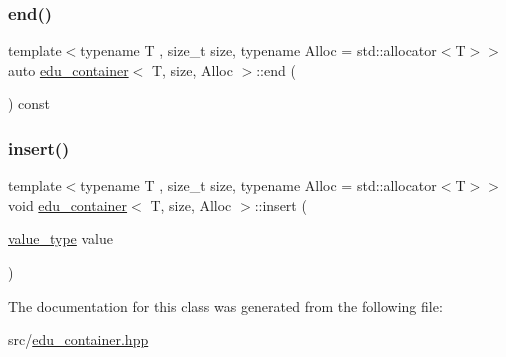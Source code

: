 \mbox{\label{classedu__container_aa32c0fa70c685557a5d35fe48a8fa1c2}} 
\subsubsection{\texorpdfstring{end()}{end()}}
{\footnotesize\ttfamily template$<$typename T , size\+\_\+t size, typename Alloc  = std\+::allocator$<$\+T$>$$>$ \\
auto \hyperlink{classedu__container}{edu\+\_\+container}$<$ T, size, Alloc $>$\+::end (\begin{DoxyParamCaption}{ }\end{DoxyParamCaption}) const\hspace{0.3cm}{\ttfamily [inline]}}

\mbox{\label{classedu__container_ae82187bdb440b98d824bc6752c940e51}} 
\subsubsection{\texorpdfstring{insert()}{insert()}}
{\footnotesize\ttfamily template$<$typename T , size\+\_\+t size, typename Alloc  = std\+::allocator$<$\+T$>$$>$ \\
void \hyperlink{classedu__container}{edu\+\_\+container}$<$ T, size, Alloc $>$\+::insert (\begin{DoxyParamCaption}\item[{\hyperlink{classedu__container_a1a1a693013d3f6fd261d6e3532ec2a11}{value\+\_\+type}}]{value }\end{DoxyParamCaption})\hspace{0.3cm}{\ttfamily [inline]}}



The documentation for this class was generated from the following file\+:\begin{DoxyCompactItemize}
\item 
src/\hyperlink{edu__container_8hpp}{edu\+\_\+container.\+hpp}\end{DoxyCompactItemize}
